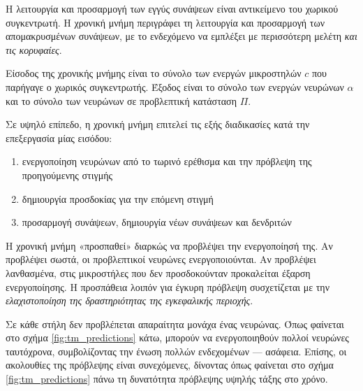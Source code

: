 	Η λειτουργία και προσαρμογή των εγγύς συνάψεων είναι αντικείμενο του χωρικού συγκεντρωτή.
	Η χρονική μνήμη περιγράφει τη λειτουργία και προσαρμογή των απομακρυσμένων συνάψεων,
	με το ενδεχόμενο να εμπλέξει με περισσότερη μελέτη \textit{και τις κορυφαίες}.

	Είσοδος της χρονικής μνήμης είναι το σύνολο των ενεργών μικροστηλών $c$ που παρήγαγε ο χωρικός συγκεντρωτής.
	Έξοδος είναι το σύνολο των ενεργών νευρώνων $α$ και το σύνολο των νευρώνων σε προβλεπτική κατάσταση $Π$.

	Σε υψηλό επίπεδο, η χρονική μνήμη επιτελεί τις εξής διαδικασίες κατά την επεξεργασία μίας εισόδου:
	\begin{enumerate}
		\item ενεργοποίηση νευρώνων από το τωρινό ερέθισμα και την πρόβλεψη της προηγούμενης στιγμής
		\item δημιουργία προσδοκίας για την επόμενη στιγμή
		\item προσαρμογή συνάψεων, δημιουργία νέων συνάψεων και δενδριτών
	\end{enumerate}

	Η χρονική μνήμη «προσπαθεί» διαρκώς να προβλέψει την ενεργοποίησή της.
	Αν προβλέψει σωστά, οι προβλεπτικοί νευρώνες ενεργοποιούνται.
	Αν προβλέψει λανθασμένα, στις μικροστήλες που δεν προσδοκούνταν προκαλείται έξαρση ενεργοποίησης.
	Η προσπάθεια λοιπόν για έγκυρη πρόβλεψη συσχετίζεται με την \textit{ελαχιστοποίηση της δραστηριότητας της εγκεφαλικής περιοχής}.

	Σε κάθε στήλη δεν προβλέπεται απαραίτητα μονάχα ένας νευρώνας. Όπως φαίνεται στο σχήμα
	\ref{fig:tm_predictions} κάτω, μπορούν να ενεργοποιηθούν πολλοί νευρώνες ταυτόχρονα,
	συμβολίζοντας την ένωση πολλών ενδεχομένων --- ασάφεια.
	Επίσης, οι ακολουθίες της πρόβλεψης είναι συνεχόμενες, δίνοντας όπως φαίνεται στο σχήμα
	\ref{fig:tm_predictions} πάνω τη δυνατότητα πρόβλεψης υψηλής τάξης στο χρόνο.

